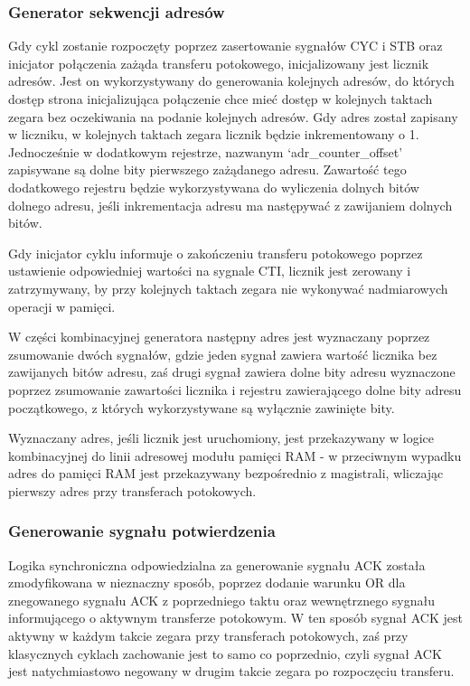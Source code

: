 \subsubsection{Generator sekwencji adresów}

Gdy cykl zostanie rozpoczęty poprzez zasertowanie sygnałów CYC i STB oraz inicjator połączenia zażąda transferu potokowego, inicjalizowany jest licznik adresów. Jest on wykorzystywany do generowania kolejnych adresów, do których dostęp strona inicjalizująca połączenie chce mieć dostęp w kolejnych taktach zegara bez oczekiwania na podanie kolejnych adresów. Gdy adres został zapisany w liczniku, w kolejnych taktach zegara licznik będzie inkrementowany o 1.
Jednocześnie w dodatkowym rejestrze, nazwanym `adr_counter_offset' zapisywane są dolne bity pierwszego zażądanego adresu. Zawartość tego dodatkowego rejestru będzie wykorzystywana do wyliczenia dolnych bitów dolnego adresu, jeśli inkrementacja adresu ma następywać z zawijaniem dolnych bitów.

Gdy inicjator cyklu informuje o zakończeniu transferu potokowego poprzez ustawienie odpowiedniej wartości na sygnale CTI, licznik jest zerowany i zatrzymywany, by przy kolejnych taktach zegara nie wykonywać nadmiarowych operacji w pamięci.

W części kombinacyjnej generatora następny adres jest wyznaczany poprzez zsumowanie dwóch sygnałów, gdzie jeden sygnał zawiera wartość licznika bez zawijanych bitów adresu, zaś drugi sygnał zawiera dolne bity adresu wyznaczone poprzez zsumowanie zawartości licznika i rejestru zawierającego dolne bity adresu początkowego, z których wykorzystywane są wyłącznie zawinięte bity.

Wyznaczany adres, jeśli licznik jest uruchomiony, jest przekazywany w logice kombinacyjnej do linii adresowej modułu pamięci RAM - w przeciwnym wypadku adres do pamięci RAM jest przekazywany bezpośrednio z magistrali, wliczając pierwszy adres przy transferach potokowych.

\subsubsection{Generowanie sygnału potwierdzenia}

Logika synchroniczna odpowiedzialna za generowanie sygnału ACK została zmodyfikowana w nieznaczny sposób, poprzez dodanie warunku OR dla znegowanego sygnału ACK z poprzedniego taktu oraz wewnętrznego sygnału informującego o aktywnym transferze potokowym. W ten sposób sygnał ACK jest aktywny w każdym takcie zegara przy transferach potokowych, zaś przy klasycznych cyklach zachowanie jest to samo co poprzednio, czyli sygnał ACK jest natychmiastowo negowany w drugim takcie zegara po rozpoczęciu transferu.
